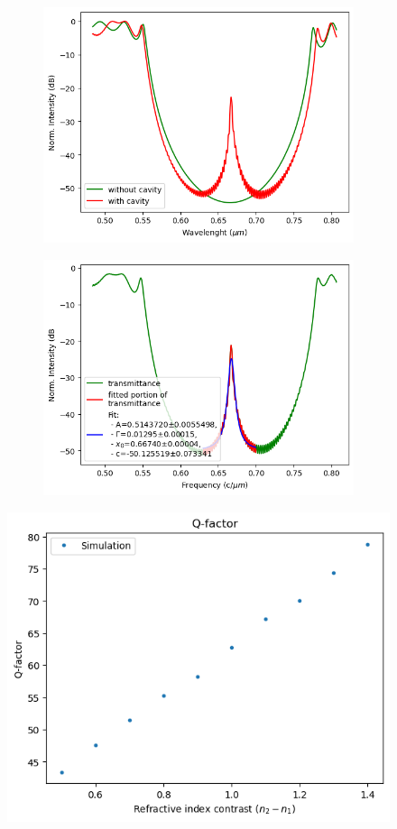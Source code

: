 \begin{figure}[H]
    \centering
    \begin{subfigure}[b]{0.45\linewidth}
        \centering
        \includegraphics[width=\linewidth]{Figures/bragg_vs_cavity_spectrum.png}
        \caption{}
        \label{fig:bragg_vs_cavity_spectrum}
    \end{subfigure}
    \hfill
    \begin{subfigure}[b]{0.45\linewidth}
        \centering
        \includegraphics[width=\linewidth]{Figures/bragg_cavity_spectrum_fit.png}
        \caption{}
        \label{fig:bragg_cavity_spectrum_fit}
    \end{subfigure}
\end{figure}

\begin{figure}[H]
    \centering
    \includegraphics[width=0.6\linewidth]{Figures/bragg_cavity_qfactor_vs_index.png}
    \caption{}
    \label{fig:bragg_cavity_qfactor_vs_index}
\end{figure}